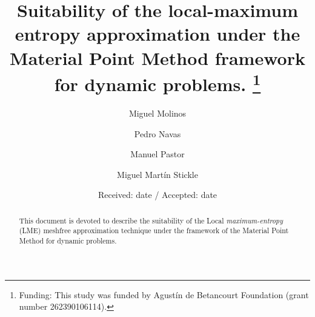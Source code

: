 \newcommand{\Matrix}[1]{
  \ensuremath{\mathbf{{#1}}}
}
\newcommand{\Vector}[1]{
  \ensuremath{\mathbf{{#1}}}
}

\newcommand{\Div}[1]{
  \ensuremath{\nabla \cdot {#1}}
}
\newcommand\Grad[1]{\nabla{#1}}
\newcommand\GradS[1]{\nabla^s{#1}}
\newcommand\GradT[1]{\nabla^T{#1}}


\newcommand{\Deriv}[3][]{
  \ensuremath{\frac{\partial^{#1}{#2}}{ \partial {#3}^{#1} }}
}

\newcommand{\Integral}[2]{
  \IfStrEqCase{#1}{
    {2}{\ensuremath{\int_{\varGamma_d}{#2}\ d\varGamma}}
    {3}{\ensuremath{\int_{\varOmega}{#2}\ d\varOmega}}
  }
}

%
%




\title{Suitability of the local-maximum entropy approximation under
  the Material Point Method framework for dynamic problems. \thanks{Funding: This
    study was funded by Agustín de Betancourt Foundation (grant number
    262390106114).}
}


\author{Miguel Molinos \and
  Pedro Navas \and
  Manuel Pastor \and
  Miguel Martín Stickle
}




\date{Received: date / Accepted: date}

\maketitle
\begin{abstract}
  This document is devoted to describe the suitability of the Local
  \textit{maximum-entropy} (LME) meshfree approximation technique under the framework of the
  Material Point Method for dynamic problems. 
\end{abstract}

